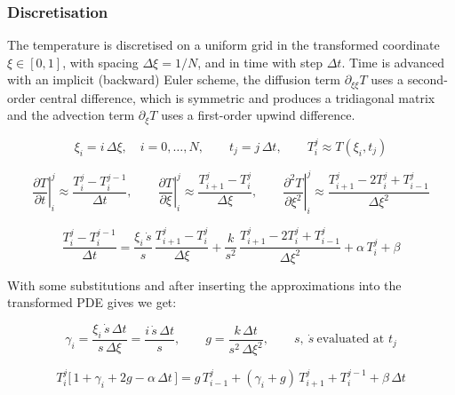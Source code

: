 \subsubsection*{Discretisation }

The temperature is discretised on a uniform grid in the transformed coordinate $\xi \in [0,1]$, with spacing $\Delta\xi = 1/N$, and in time with step $\Delta t$. Time is advanced with an implicit (backward) Euler scheme, the diffusion term $\partial_{\xi\xi}T$ uses a second-order central difference, which is symmetric and produces a tridiagonal matrix and the advection term $\partial_\xi T$ uses a first-order upwind difference.

\begin{equation*}
\xi_i = i\,\Delta\xi, \quad i = 0,\dots,N,
\qquad t_j = j\,\Delta t, \qquad T_i^j \approx T(\xi_i, t_j)
\end{equation*}

\begin{equation} 
\label{eq:fd_approx}
\left.\frac{\partial T}{\partial t}\right|_i^j \approx \frac{T_i^j - T_i^{j-1}}{\Delta t},
\qquad
\left.\frac{\partial T}{\partial \xi}\right|_i^j \approx \frac{T_{i+1}^j - T_i^j}{\Delta \xi},
\qquad
\left.\frac{\partial^2 T}{\partial \xi^2}\right|_i^j \approx \frac{T_{i+1}^j - 2T_i^j + T_{i-1}^j}{\Delta \xi^2}
\end{equation}

\begin{equation}
\label{eq:filament_discrete}
\frac{T_i^j - T_i^{j-1}}{\Delta t}
= \frac{\xi_i\,\dot s}{s}\,\frac{T_{i+1}^j - T_i^j}{\Delta \xi}
+ \frac{k}{s^2}\,\frac{T_{i+1}^j - 2T_i^j + T_{i-1}^j}{\Delta \xi^2}
+ \alpha\,T_i^j + \beta
\end{equation}

With some substitutions and after inserting the approximations into the transformed PDE gives we get:

\begin{equation*}
\gamma_i = \frac{\xi_i\,\dot s\,\Delta t}{s\,\Delta \xi} = \frac{i\,\dot s\,\Delta t}{s},
\qquad
g = \frac{k\,\Delta t}{s^2\,\Delta \xi^2},
\qquad s,\ \dot s \ \text{evaluated at } t_j
\end{equation*}

\begin{equation}
\label{eq:filament_scheme}
\boxed{T_i^j\big[\,1 + \gamma_i + 2g - \alpha\,\Delta t\,\big]
= g\,T_{i-1}^j + (\gamma_i + g)\,T_{i+1}^j + T_i^{j-1} + \beta\,\Delta t}
\end{equation}

